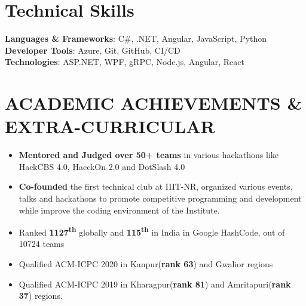 \documentclass[letterpaper,11pt]{article}
\newcommand{\achievementItem}[1]{
  \item\small{
    {#1 \vspace{-6pt}}
  }
}
\begin{document}
\section{Technical Skills}
 \begin{itemize}[leftmargin=0.15in, label={}]
    {\item{
     \textbf{Languages \& Frameworks}{: C\#, .NET, Angular, JavaScript, Python} \\
     \vspace{1pt}
     \textbf{Developer Tools}{: Azure, Git, GitHub, CI/CD} \\
     \vspace{1pt}
     \textbf{Technologies}{: ASP.NET, WPF, gRPC, Node.js, Angular, React} \\
    }}
 \end{itemize}
 \vspace{-16pt}



\section{ACADEMIC ACHIEVEMENTS \& EXTRA-CURRICULAR}

\begin{itemize}[leftmargin=0.2in]
  \achievementItem{\textbf{Mentored and Judged over 50+ teams} in various hackathons like HackCBS 4.0, HacckOn 2.0 and DotSlash 4.0}
  \achievementItem{\textbf{Co-founded}  the  first  technical  club  at  IIIT-NR,  organized  various  events, talks and hackathons to  promote competitive programming and development while improve the coding environment of the Institute.}
  \achievementItem{Ranked \textbf{1127\textsuperscript{th}} globally and \textbf{115\textsuperscript{th}} in India in Google HashCode, out of 10724 teams}
  \achievementItem{Qualified ACM-ICPC 2020 in Kanpur(\textbf{rank 63}) and Gwalior regions}
  \achievementItem{Qualified ACM-ICPC 2019 in Kharagpur(\textbf{rank 81}) and Amritapuri(\textbf{rank 37}) regions.}
\end{itemize}
\end{document}

